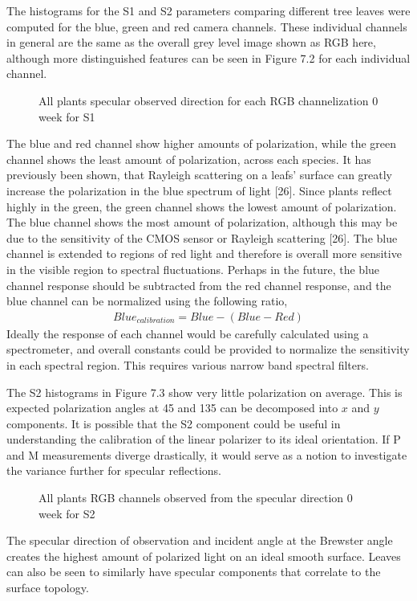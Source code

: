 The histograms for the S1 and S2 parameters comparing different tree leaves were computed for the blue, green and red camera channels.  These individual channels in general are the same as the overall grey level image shown as RGB here, although more distinguished features can be seen in Figure 7.2 for each individual channel.
%
\begin{sidewaysfigure}
    \begin{center}
    \end{center}
    \caption{All plants specular observed direction for each RGB channelization 0 week for S1}
    \label{fig:polarization}
\end{sidewaysfigure}
%
%
The blue and red channel show higher amounts of polarization, while the green channel shows the least amount of polarization, across each species.  It has previously been shown, that Rayleigh scattering on a leafs' surface can greatly increase the polarization in the blue spectrum of light [26].  Since plants reflect highly in the green, the green channel shows the lowest amount of polarization.  The blue channel shows the most amount of polarization, although this may be due to the sensitivity of the CMOS sensor or Rayleigh scattering [26].  The blue channel is extended to regions of red light and therefore is overall more sensitive in the visible region to spectral fluctuations.  Perhaps in the future, the blue channel response should be subtracted from the red channel response, and the blue channel can be normalized using the following ratio,
%
\begin{align}
    Blue_{calibration} = Blue - (Blue - Red)
\end{align}
%
Ideally the response of each channel would be carefully calculated using a spectrometer, and overall constants could be provided to normalize the sensitivity in each spectral region.  This requires various narrow band spectral filters.

The S2 histograms in Figure 7.3 show very little polarization on average.  This is expected polarization angles at 45 and 135 can be decomposed into $x$ and $y$ components.  It is possible that the S2 component could be useful in understanding the calibration of the linear polarizer to its ideal orientation.  If P and M measurements diverge drastically, it would serve as a notion to investigate the variance further for specular reflections.
%
\begin{sidewaysfigure}
    \begin{center}
    \end{center}
    \caption{All plants RGB channels observed from the specular direction 0 week for S2}
    \label{fig:polarization}
\end{sidewaysfigure}
The specular direction of observation and incident angle at the Brewster angle creates the highest amount of polarized light on an ideal smooth surface.  Leaves can also be seen to similarly have specular components that correlate to the surface topology.

